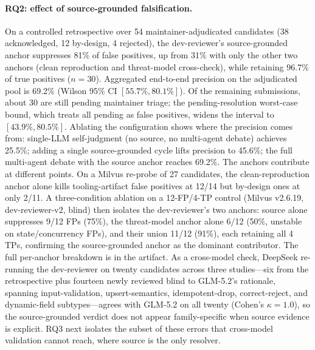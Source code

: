 \documentclass[sigconf]{acmart}
\begin{document}
\paragraph{RQ2: effect of source-grounded falsification.}
On a controlled retrospective over 54 maintainer-adjudicated candidates (38 acknowledged, 12 by-design, 4 rejected), the dev-reviewer's source-grounded anchor suppresses 81\% of false positives, up from 31\% with only the other two anchors (clean reproduction and threat-model cross-check), while retaining 96.7\% of true positives ($n{=}30$). Aggregated end-to-end precision on the adjudicated pool is 69.2\% (Wilson 95\% CI $[55.7\%, 80.1\%]$). Of the remaining submissions, about 30 are still pending maintainer triage; the pending-resolution worst-case bound, which treats all pending as false positives, widens the interval to $[43.9\%, 80.5\%]$. Ablating the configuration shows where the precision comes from: single-LLM self-judgment (no source, no multi-agent debate) achieves 25.5\%; adding a single source-grounded cycle lifts precision to 45.6\%; the full multi-agent debate with the source anchor reaches 69.2\%. The anchors contribute at different points. On a Milvus re-probe of 27 candidates, the clean-reproduction anchor alone kills tooling-artifact false positives at 12/14 but by-design ones at only 2/11. A three-condition ablation on a 12-FP/4-TP control (Milvus v2.6.19, dev-reviewer-v2, blind) then isolates the dev-reviewer's two anchors: source alone suppresses 9/12 FPs (75\%), the threat-model anchor alone 6/12 (50\%, unstable on state/concurrency FPs), and their union 11/12 (91\%), each retaining all 4 TPs, confirming the source-grounded anchor as the dominant contributor. The full per-anchor breakdown is in the artifact. As a cross-model check, DeepSeek re-running the dev-reviewer on twenty candidates across three studies---six from the retrospective plus fourteen newly reviewed blind to GLM-5.2's rationale, spanning input-validation, upsert-semantics, idempotent-drop, correct-reject, and dynamic-field subtypes---agrees with GLM-5.2 on all twenty (Cohen's $\kappa = 1.0$), so the source-grounded verdict does not appear family-specific when source evidence is explicit. RQ3 next isolates the subset of these errors that cross-model validation cannot reach, where source is the only resolver.
\end{document}
